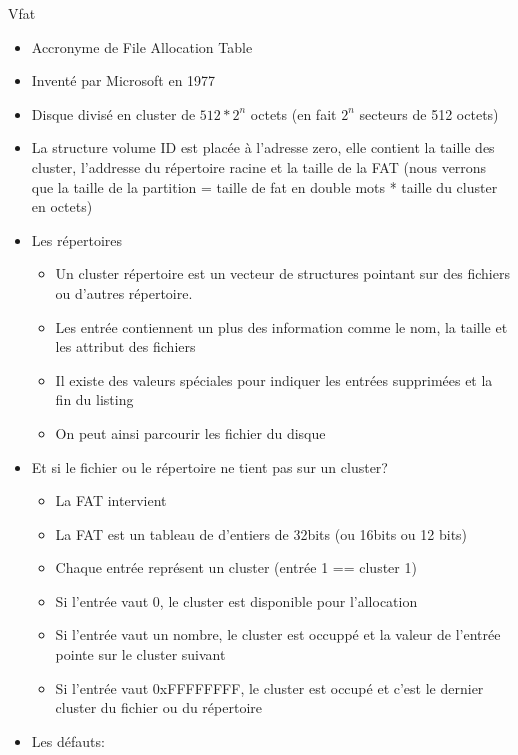 \begin{frame}[fragile=singleslide]{Vfat}
  \begin{itemize}
  \item Accronyme de File Allocation Table
  \item Inventé par Microsoft en 1977
  \item Disque divisé en cluster de  $512 * 2^n$ octets (en fait $2^n$
    secteurs de 512 octets)
  \item  La structure  volume ID  est  placée à  l'adresse zero,  elle
    contient la taille des cluster, l'addresse du répertoire racine et
    la taille de la FAT (nous  verrons que la taille de la partition =
    taille de fat en double mots * taille du cluster en octets)
  \item Les répertoires
    \begin{itemize}
    \item Un cluster répertoire  est un vecteur de structures pointant
      sur des fichiers ou d'autres répertoire.
    \item Les entrée contiennent un plus des information comme le nom,
      la taille et les attribut des fichiers
    \item Il  existe des valeurs  spéciales pour indiquer  les entrées
      supprimées et la fin du listing
    \item On peut ainsi parcourir les fichier du disque
    \end{itemize}
  \item Et si le fichier ou le répertoire ne tient pas sur un cluster?
    \begin{itemize}
    \item La FAT intervient
    \item La FAT  est un tableau de d'entiers de  32bits (ou 16bits ou
      12 bits)
    \item Chaque entrée représent un cluster (entrée 1 == cluster 1)
    \item  Si  l'entrée  vaut   0,  le  cluster  est  disponible  pour
      l'allocation
    \item Si  l'entrée vaut  un nombre, le  cluster est occuppé  et la
      valeur de l'entrée pointe sur le cluster suivant
    \item Si l'entrée vaut 0xFFFFFFFF,  le cluster est occupé et c'est
      le dernier cluster du fichier ou du répertoire
    \end{itemize}
  \item Les défauts:
    \begin{itemize}

\end{itemize}
\end{itemize}
\end{frame}
